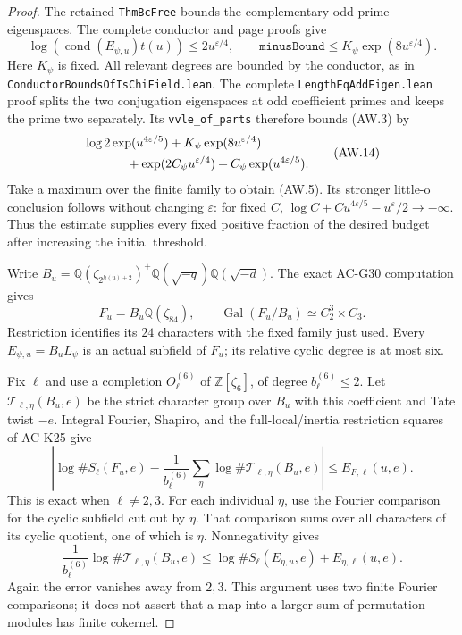 \begin{proof}
The retained \texttt{ThmBcFree} bounds the complementary
odd-prime eigenspaces.  The complete conductor and page proofs give
\[
 \log(\operatorname{cond}(E_{\psi,u})t(u))
                                  \leq2u^{\varepsilon/4},
 \qquad
 \texttt{minusBound}\leq K_\psi\exp(8u^{\varepsilon/4}).        \tag{AW.13}
\]
Here $K_\psi$ is fixed.  All relevant degrees are bounded by the
conductor, as in \texttt{ConductorBoundsOf\allowbreak IsChiField.lean}.
The complete \texttt{LengthEqAddEigen.lean} proof splits
the two conjugation eigenspaces at odd coefficient primes and
keeps the prime two separately.  Its \texttt{vvle\_of\_parts}
therefore bounds (AW.3) by
\[
 \begin{split}
 &\log2\exp(u^{4\varepsilon/5})
   +K_\psi\exp(8u^{\varepsilon/4})\\
 &\hspace{12mm}+\exp(2C_\psi u^{\varepsilon/4})
                   +C_\psi\exp(u^{4\varepsilon/5}).
 \end{split}                                                 \tag{AW.14}
\]
Take a maximum over the finite family to obtain (AW.5).
Its stronger little-o conclusion follows without changing
$\varepsilon$: for fixed $C$,
$\log C+Cu^{4\varepsilon/5}-u^\varepsilon/2\to-\infty$.
Thus the estimate supplies every fixed positive fraction of
the desired budget after increasing the initial threshold.

Write
$B_u=\mathbb Q(\zeta_{2^{h(u)+2}})^+
\mathbb Q(\sqrt{-q})\mathbb Q(\sqrt{-d})$.
The exact AC-G30 computation gives
\[
 F_u=B_u\mathbb Q(\zeta_{84}),\qquad
 \operatorname{Gal}(F_u/B_u)\simeq C_2^3\times C_3.              \tag{AW.15}
\]
Restriction identifies its $24$ characters with the fixed family
just used.  Every $E_{\psi,u}=B_uL_\psi$ is an actual subfield
of $F_u$; its relative cyclic degree is at most six.

Fix $\ell$ and use a completion $O^{(6)}_\ell$ of
$\mathbb Z[\zeta_6]$, of degree $b^{(6)}_\ell\leq2$.
Let $\mathcal T_{\ell,\eta}(B_u,e)$ be the strict character
group over $B_u$ with this coefficient and Tate twist $-e$.
Integral Fourier, Shapiro, and the full-local/inertia restriction
squares of AC-K25 give
\[
 \left|\log\#S_\ell(F_u,e)
 -\frac1{b^{(6)}_\ell}\sum_\eta
                     \log\#\mathcal T_{\ell,\eta}(B_u,e)\right|
                                  \leq E_{F,\ell}(u,e).        \tag{AW.16}
\]
This is exact when $\ell\ne2,3$.
For each individual $\eta$, use the Fourier comparison for the
cyclic subfield cut out by $\eta$.  That comparison sums over
all characters of its cyclic quotient, one of which is $\eta$.
Nonnegativity gives
\[
 \frac1{b^{(6)}_\ell}\log\#\mathcal T_{\ell,\eta}(B_u,e)
       \leq\log\#S_\ell(E_{\eta,u},e)+E_{\eta,\ell}(u,e).
                                                                    \tag{AW.17}
\]
Again the error vanishes away from $2,3$.
This argument uses two finite Fourier comparisons; it does not
assert that a map into a larger sum of permutation modules has
finite cokernel.


\end{proof}
